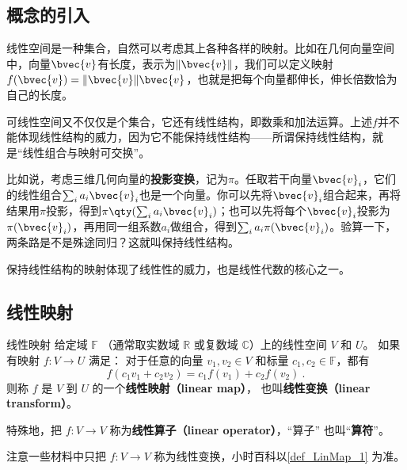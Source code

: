 
\begin{issues}
\end{issues}




\subsection{概念的引入}

线性空间是一种集合，自然可以考虑其上各种各样的映射。比如在几何向量空间中，向量$\bvec{v}$有长度，表示为$\lVert \bvec{v} \rVert$，我们可以定义映射$f(\bvec{v})=\lVert \bvec{v} \rVert\bvec{v}$，也就是把每个向量都伸长，伸长倍数恰为自己的长度。

可线性空间又不仅仅是个集合，它还有线性结构，即数乘和加法运算。上述$f$并不能体现线性结构的威力，因为它不能保持线性结构——所谓保持线性结构，就是“线性组合与映射可交换”。

比如说，考虑三维几何向量的\textbf{投影变换}，记为$\pi$。任取若干向量$\bvec{v}_i$，它们的线性组合$\sum_{i}a_i\bvec{v}_i$也是一个向量。你可以先将$\bvec{v}_i$组合起来，再将结果用$\pi$投影，得到$\pi\qty(\sum_{i}a_i\bvec{v}_i)$；也可以先将每个$\bvec{v}_i$投影为$\pi(\bvec{v}_i)$，再用同一组系数$a_i$做组合，得到$\sum_{i}a_i\pi(\bvec{v}_i)$。验算一下，两条路是不是殊途同归？这就叫保持线性结构。

保持线性结构的映射体现了线性性的威力，也是线性代数的核心之一。

\subsection{线性映射}

\begin{definition}{线性映射}\label{def_LinMap_1}
给定域 $\mathbb F$ （通常取实数域 $\mathbb R$ 或复数域 $\mathbb C$）上的线性空间 $V$ 和 $U$。 如果有映射 $f:V\rightarrow U$ 满足： 对于任意的向量 ${v}_1, {v}_2\in V$ 和标量 $c_1, c_2 \in \mathbb{F}$，都有
\begin{equation}
f(c_1 {v}_1+c_2 {v}_2)=c_1f({v}_1)+c_2f({v}_2)~.
\end{equation}
则称 $f$ 是 $V$ 到 $U$ 的一个\textbf{线性映射（linear map）}， 也叫\textbf{线性变换（linear transform）}。

特殊地，把 $f:V\to V$ 称为\textbf{线性算子（linear operator）}，“算子” 也叫“\textbf{算符}”。
\end{definition}
注意一些材料中只把 $f:V\to V$ 称为线性变换，小时百科以\autoref{def_LinMap_1} 为准。


